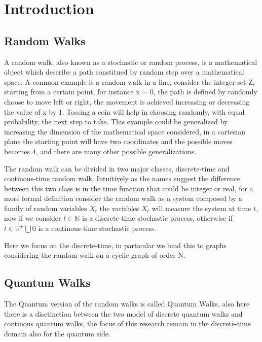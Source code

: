 \section{Introduction}
\subsection{Random Walks}

A random walk, also known as a stochastic or random process, is a mathematical object which describe a path constitued by random step over a mathematical space. A common 
example is a random walk in a line, consider the integer set Z, starting from a certain point, for instance x = 0, the path is defined by randomly choose to move left or 
right, the movement is achieved increasing or decreasing the value of x by 1. Tossing a coin will help in choosing randomly, with equal probability, the next step to take. 
This example could be generalized by increasing the dimension of the mathematical space considered, in a cartesian plane the starting point will have two  
coordinates and the possible moves becomes 4, and there are many other possible generalizations.

The random walk can be divided in two major classes, discrete-time and continous-time random walk. Intuitively as the names suggest the difference between this two class 
is in the time function that could be integer or real, for a more formal definition consider the random walk as a system composed by a family of random variables ${X_{t}}$
the variables $X_{t}$ will measure the system at time t, now if we consider $t\in \mathbb{N}$  is a discrete-time stochastic process, otherwise if 
$t \in \mathbb{R}^{+} \bigcup {0}$ is a continous-time stochastic process. 

Here we focus on the discrete-time, in particular we bind this to graphs considering the random walk on a cyclic graph of order N.

\subsection{Quantum Walks}

The Quantum version of the random walks is called Quantum Walks, also here there is a disctinction between the two model of discrete quantum walks and 
continous quantum walks, the focus of this research remain in the discrete-time domain also for the quantum side. 

